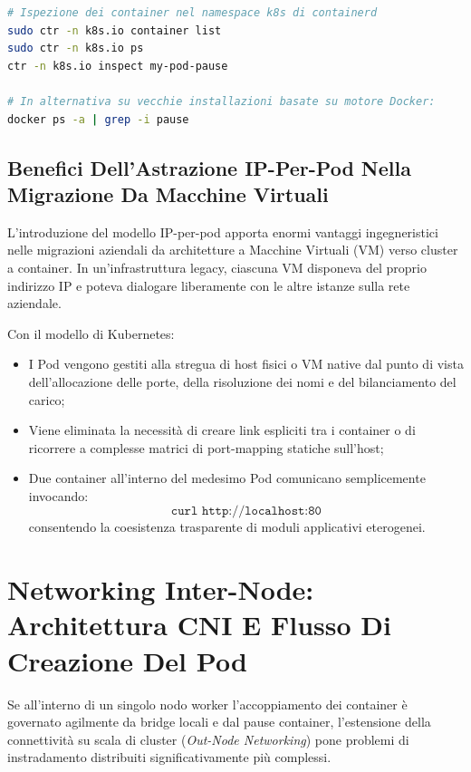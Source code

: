 \documentclass[11pt, a4paper]{article}
\begin{document}
\begin{lstlisting}[language=bash]
# Ispezione dei container nel namespace k8s di containerd
sudo ctr -n k8s.io container list
sudo ctr -n k8s.io ps
ctr -n k8s.io inspect my-pod-pause

# In alternativa su vecchie installazioni basate su motore Docker:
docker ps -a | grep -i pause
\end{lstlisting}

\subsection{Benefici Dell'Astrazione IP-Per-Pod Nella Migrazione Da Macchine Virtuali}

L'introduzione del modello IP-per-pod apporta enormi vantaggi ingegneristici nelle migrazioni aziendali da architetture a Macchine Virtuali (VM) verso cluster a container. In un'infrastruttura legacy, ciascuna VM disponeva del proprio indirizzo IP e poteva dialogare liberamente con le altre istanze sulla rete aziendale.

Con il modello di Kubernetes:
\begin{itemize}[noitemsep]
    \item I Pod vengono gestiti alla stregua di host fisici o VM native dal punto di vista dell'allocazione delle porte, della risoluzione dei nomi e del bilanciamento del carico;
    \item Viene eliminata la necessità di creare link espliciti tra i container o di ricorrere a complesse matrici di port-mapping statiche sull'host;
    \item Due container all'interno del medesimo Pod comunicano semplicemente invocando:
    \[
    \texttt{curl http://localhost:80}
    \]
    consentendo la coesistenza trasparente di moduli applicativi eterogenei.
\end{itemize}

\newpage


\section{Networking Inter-Node: Architettura CNI E Flusso Di Creazione Del Pod}

Se all'interno di un singolo nodo worker l'accoppiamento dei container è governato agilmente da bridge locali e dal pause container, l'estensione della connettività su scala di cluster (\emph{Out-Node Networking}) pone problemi di instradamento distribuiti significativamente più complessi.
\end{document}
